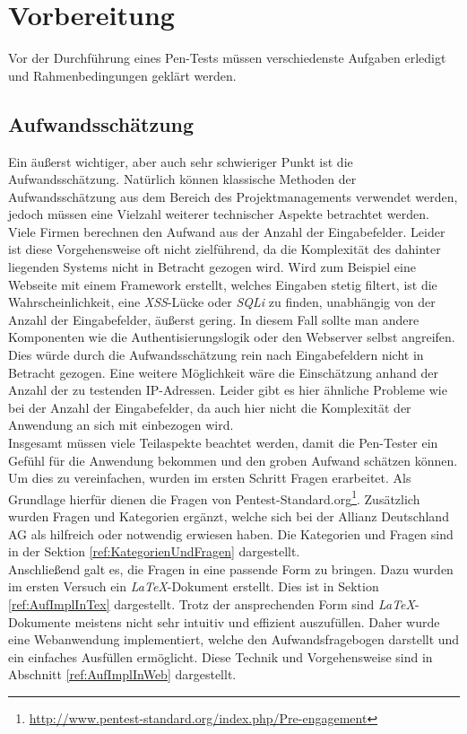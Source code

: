 \section{Vorbereitung}
Vor der Durchführung eines Pen-Tests müssen verschiedenste Aufgaben erledigt und Rahmenbedingungen geklärt werden.

\subsection{Aufwandsschätzung}
	Ein äußerst wichtiger, aber auch sehr schwieriger Punkt ist die Aufwandsschätzung. Natürlich können klassische Methoden der Aufwandsschätzung aus dem Bereich des Projektmanagements verwendet werden, jedoch müssen eine Vielzahl weiterer technischer Aspekte betrachtet werden.\\
	
	Viele Firmen berechnen den Aufwand aus der Anzahl der Eingabefelder. Leider ist diese Vorgehensweise oft nicht zielführend, da die Komplexität des dahinter liegenden Systems nicht in Betracht gezogen wird. Wird zum Beispiel eine Webseite mit einem Framework erstellt, welches Eingaben stetig filtert, ist die Wahrscheinlichkeit, eine \textit{XSS}-Lücke oder \textit{SQLi} zu finden, unabhängig von der Anzahl der Eingabefelder, äußerst gering. In diesem Fall sollte man andere Komponenten wie die Authentisierungslogik oder den Webserver selbst angreifen. Dies würde durch die Aufwandsschätzung rein nach Eingabefeldern nicht in Betracht gezogen. Eine weitere Möglichkeit wäre die Einschätzung anhand der Anzahl der zu testenden IP-Adressen. Leider gibt es hier ähnliche Probleme wie bei der Anzahl der Eingabefelder, da auch hier nicht die Komplexität der Anwendung an sich mit einbezogen wird.\\

Insgesamt müssen viele Teilaspekte beachtet werden, damit die Pen-Tester ein Gefühl für die Anwendung bekommen und den groben Aufwand schätzen können. Um dies zu vereinfachen, wurden im ersten Schritt Fragen erarbeitet. Als Grundlage hierfür dienen die Fragen von Pentest-Standard.org\footnote{\url{http://www.pentest-standard.org/index.php/Pre-engagement}}. Zusätzlich wurden Fragen und Kategorien ergänzt, welche sich bei der Allianz Deutschland AG als hilfreich oder notwendig erwiesen haben. Die Kategorien und Fragen sind in der Sektion \ref{ref:KategorienUndFragen} dargestellt.\\

Anschließend galt es, die Fragen in eine passende Form zu bringen. Dazu wurden im ersten Versuch ein \textit{LaTeX}-Dokument erstellt. Dies ist in Sektion \ref{ref:AufImplInTex} dargestellt. Trotz der ansprechenden Form sind \textit{LaTeX}-Dokumente meistens nicht sehr intuitiv und effizient auszufüllen. Daher wurde eine Webanwendung implementiert, welche den Aufwandsfragebogen darstellt und ein einfaches Ausfüllen ermöglicht. Diese Technik und Vorgehensweise sind in Abschnitt \ref{ref:AufImplInWeb} dargestellt.\\ 


